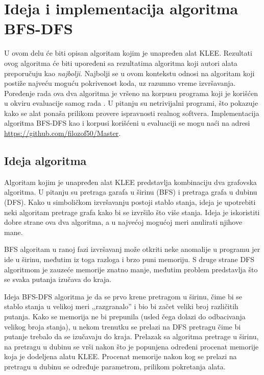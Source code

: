 \documentclass[12pt,oneside]{memoir}
\begin{document}
\chapter{Ideja i implementacija algoritma BFS-DFS} \label{algoritam}
U ovom delu će biti opisan algoritam kojim je unapređen alat KLEE. Rezultati ovog algoritma će biti upoređeni sa rezultatima algoritma koji autori alata preporučuju kao \textit{najbolji}. Najbolji se u ovom kontekstu odnosi na algoritam koji postiže najveću moguću pokrivenost koda, uz razumno vreme izvršavanja. Poređenje rada ova dva algoritma je vršeno na korpusu programa koji je korišćen u okviru evaluacije samog rada \cite{klee}. U pitanju su netrivijalni programi, što pokazuje kako se alat ponaša prilikom provere ispravnosti realnog softvera. Implementacija algoritma BFS-DFS kao i korpusi korišćeni u evaluaciji se mogu naći na adresi \url{https://github.com/filozof50/Master}.

\section{Ideja algoritma} \label{ideja_algoritma}
Algoritam kojim je unapređen alat KLEE predstavlja kombinaciju dva grafovska algoritma. U pitanju su pretraga garafa u širinu (BFS) i pretraga grafa u dubinu (DFS). Kako u simboličkom izvršavanju postoji stablo stanja, ideja je upotrebiti neki algoritam pretrage grafa kako bi se izvršilo što više stanja. Ideja je iskoristiti dobre strane ova dva algoritma, a u najvećoj mogućoj meri anulirati njihove mane. 

BFS algoritam u ranoj fazi izvršavanj može otkriti neke anomalije u programu jer ide u širinu, međutim iz toga razloga i brzo puni memoriju. S druge strane DFS algoritmom je zauzeće memorije znatno manje, međutim problem predstavlja što se svaka putanja izučava do kraja. 

Ideja BFS-DFS algoritma je da se prvo krene pretragom u širinu, čime bi se stablo stanja u velikoj meri ,,razgranalo'' i bio bi začet veliki broj različitih putanja. Kako se memorija ne bi prepunila (usled čega dolazi do odbacivanja velikog broja stanja), u nekom trenutku se prelazi na DFS pretragu čime bi putanje trebalo da se izučavaju do kraja. Prelazak sa algoritma pretrage u širinu, na pretragu u dubinu se vrši nakon što je popunjena određeni procenat memorije koja je dodeljena alatu KLEE. Procenat memorije nakon kog se prelazi na pretragu u dubinu se određuje parametrom, prilikom pokretanja alata. 
\end{document}
